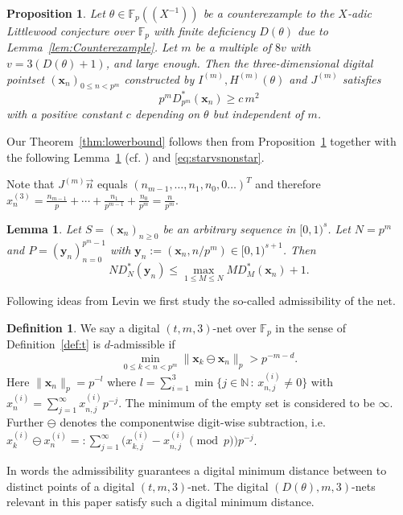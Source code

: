 \documentclass{article}
\newcommand{\bsx}{\boldsymbol{x}}%
\newcommand{\bsy}{\boldsymbol{y}}%
\newcommand{\NN}{\mathbb N}
\newcommand{\FF}{\mathbb{F}}
\renewcommand{\(}{\left (}
\renewcommand{\)}{\right )}
\newtheorem{lemma}[theorem]{Lemma}
\newtheorem{prop}[theorem]{Proposition}
\theoremstyle{definition}
\newtheorem{definition}[theorem]{Definition}
\numberwithin{equation}{section}
\begin{document}
\begin{prop}\label{thm:3}
Let $\theta\in\FF_p((X^{-1}))$ be a counterexample to the $X$-adic Littlewood conjecture over $\FF_p$ with finite deficiency $D(\theta)$ due to Lemma~\ref{lem:Counterexample}. Let $m$ be a multiple of $8v$ with $v=3(D(\theta)+1)$, and large enough. Then the three-dimensional digital pointset $(\bsx_n)_{0\leq n<p^m}$ constructed by $I^{(m)},H^{(m)}(\theta)$ and $J^{(m)}$ satisfies 
$$p^mD^*_{p^m}(\bsx_n)\geq c\, m^2$$
with a positive constant $c$ depending on $\theta$ but independent of $m$. 
\end{prop}
Our Theorem~\ref{thm:lowerbound} follows then from Proposition~\ref{thm:3} together with the following Lemma~\ref{lem:2} (cf. \cite[Lemma 3.7]{niesiam}) and \eqref{eq:starvsnonstar}. 

Note that $J^{(m)}\vec{n}$ equals $(n_{m-1},\ldots,n_1,n_0,0\ldots)^T$ and therefore $x_n^{(3)}=\frac{n_{m-1}}{p}+\cdots+\frac{n_{1}}{p^{m-1}}+\frac{n_{0}}{p^m}=\frac{n}{p^m}$. 

\begin{lemma}\label{lem:2}
Let $S=(\bsx_n)_{n\geq 0}$ be an arbitrary sequence in $[0,1)^s$. Let $N=p^m$ and $P=(\bsy_n)_{n=0}^{p^m-1}$ with $\bsy_n:=(\bsx_n,n/p^m)\in[0,1)^{s+1}$. Then 
$$ND^*_N(\bsy_n)\leq \max_{1\leq M\leq N}MD^*_M(\bsx_n)+1.$$ 
\end{lemma}

Following ideas from Levin \cite{Levints1} we first study the so-called admissibility of the net. 
\begin{definition}\label{def:admissible}
We say a digital $(t,m,3)$-net over $\FF_p$ in the sense of Definition~\ref{def:t} is $d$-admissible if $$\min_{0\leq k<  n<p^m}\|\bsx_k\ominus \bsx_n\|_p>p^{-m-d}.$$
Here $\|\bsx_n\|_p=p^{-l}$ where $l=\sum_{i=1}^3\min\{j\in\NN\,:\,x_{n,j}^{(i)}\neq 0\}$ with $x_n^{(i)}=\sum_{j=1}^\infty x_{n,j}^{(i)}p^{-j}$. The minimum of the empty set is considered to be $\infty$. Further $\ominus$ denotes the componentwise digit-wise subtraction, i.e. $x^{(i)}_k\ominus x^{(i)}_n=:\sum_{j=1}^\infty \Big(x_{k,j}^{(i)}-x_{n,j}^{(i)}\pmod{p}\Big)p^{-j}$. 
\end{definition}
In words the admissibility guarantees a {digital minimum distance} between to distinct points of a digital $(t,m,3)$-net. The digital $(D(\theta),m,3)$-nets relevant in this paper satisfy such a digital minimum distance. 
\end{document}
